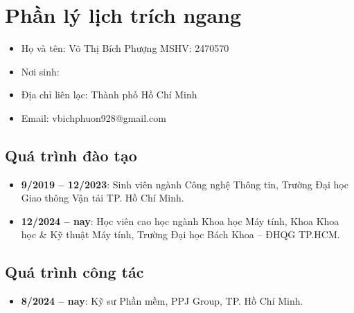 \chapter*{Phần lý lịch trích ngang}
\pagestyle{fancy}

\vspace{0.5cm}
\begin{itemize}
    \item[] Họ và tên: Võ Thị Bích Phượng \hfill MSHV: 2470570
    \vspace{0.2cm}
    \item[]  Nơi sinh: \dotfill
    \vspace{0.2cm}
    \item[] Địa chỉ liên lạc: Thành phố Hồ Chí Minh
    \vspace{0.2cm}
    \item[] Email: vbichphuon928@gmail.com
\end{itemize}

\section*{Quá trình đào tạo}
\begin{itemize}
    \item \textbf{9/2019 -- 12/2023}: Sinh viên ngành Công nghệ Thông tin, Trường Đại học Giao thông Vận tải TP. Hồ Chí Minh.
    \item \textbf{12/2024 -- nay}: Học viên cao học ngành Khoa học Máy tính, Khoa Khoa học \& Kỹ thuật Máy tính, Trường Đại học Bách Khoa -- ĐHQG TP.HCM.
\end{itemize}

\section*{Quá trình công tác}
\begin{itemize}
    \item \textbf{8/2024 -- nay}: Kỹ sư Phần mềm, PPJ Group, TP. Hồ Chí Minh.
\end{itemize}
